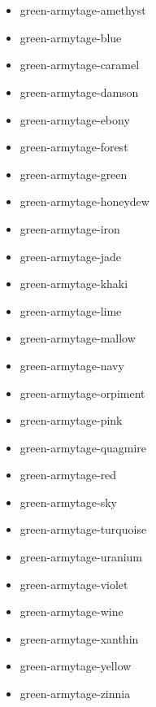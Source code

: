 \documentclass{article}
\begin{document}
\newpage
\section{\textcite{green-armytage-2010-color}}

\begin{multicols}{2}
    \begin{itemize}
        \item \textcolor{green-armytage-amethyst}{green-armytage-amethyst}
        \item \textcolor{green-armytage-blue}{green-armytage-blue}
        \item \textcolor{green-armytage-caramel}{green-armytage-caramel}
        \item \textcolor{green-armytage-damson}{green-armytage-damson}
        \item \textcolor{green-armytage-ebony}{green-armytage-ebony}
        \item \textcolor{green-armytage-forest}{green-armytage-forest}
        \item \textcolor{green-armytage-green}{green-armytage-green}
        \item \textcolor{green-armytage-honeydew}{green-armytage-honeydew}
        \item \textcolor{green-armytage-iron}{green-armytage-iron}
        \item \textcolor{green-armytage-jade}{green-armytage-jade}
        \item \textcolor{green-armytage-khaki}{green-armytage-khaki}
        \item \textcolor{green-armytage-lime}{green-armytage-lime}
        \item \textcolor{green-armytage-mallow}{green-armytage-mallow}
        \item \textcolor{green-armytage-navy}{green-armytage-navy}
        \item \textcolor{green-armytage-orpiment}{green-armytage-orpiment}
        \item \textcolor{green-armytage-pink}{green-armytage-pink}
        \item \textcolor{green-armytage-quagmire}{green-armytage-quagmire}
        \item \textcolor{green-armytage-red}{green-armytage-red}
        \item \textcolor{green-armytage-sky}{green-armytage-sky}
        \item \textcolor{green-armytage-turquoise}{green-armytage-turquoise}
        \item \textcolor{green-armytage-uranium}{green-armytage-uranium}
        \item \textcolor{green-armytage-violet}{green-armytage-violet}
        \item \textcolor{green-armytage-wine}{green-armytage-wine}
        \item \textcolor{green-armytage-xanthin}{green-armytage-xanthin}
        \item \textcolor{green-armytage-yellow}{green-armytage-yellow}
        \item \textcolor{green-armytage-zinnia}{green-armytage-zinnia}
    \end{itemize}
\end{multicols}
\end{document}

